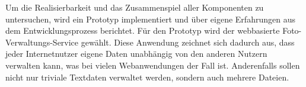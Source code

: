 Um die Realisierbarkeit und das Zusammenspiel aller Komponenten zu untersuchen, wird ein Prototyp implementiert und über eigene Erfahrungen aus dem Entwicklungsprozess berichtet. Für den Prototyp wird der webbasierte Foto-Verwaltungs-Service gewählt. Diese Anwendung zeichnet sich dadurch aus, dass jeder Internetnutzer eigene Daten unabhängig von den anderen Nutzern verwalten kann, was bei vielen Webanwendungen der Fall ist. Anderenfalls sollen nicht nur triviale Textdaten verwaltet werden, sondern auch mehrere Dateien.



